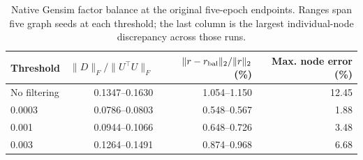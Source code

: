 \begin{table}[htbp]
\caption{Native Gensim factor balance at the original five-epoch endpoints. Ranges span five graph seeds at each threshold; the last column is the largest individual-node discrepancy across those runs.}
\label{tab:factor-balance}
\centering
\begin{tabular}{lrrr}
\toprule
Threshold & $\|D\|_F/\|U^\top U\|_F$ & $\|r-r_{\rm bal}\|_2/\|r\|_2$ (\%) & Max. node error (\%) \\
\midrule
No filtering & 0.1347--0.1630 & 1.054--1.150 & 12.45 \\
0.0003 & 0.0786--0.0803 & 0.548--0.567 & 1.88 \\
0.001 & 0.0944--0.1066 & 0.648--0.726 & 3.48 \\
0.003 & 0.1264--0.1491 & 0.874--0.968 & 6.68 \\
\bottomrule
\end{tabular}
\end{table}
